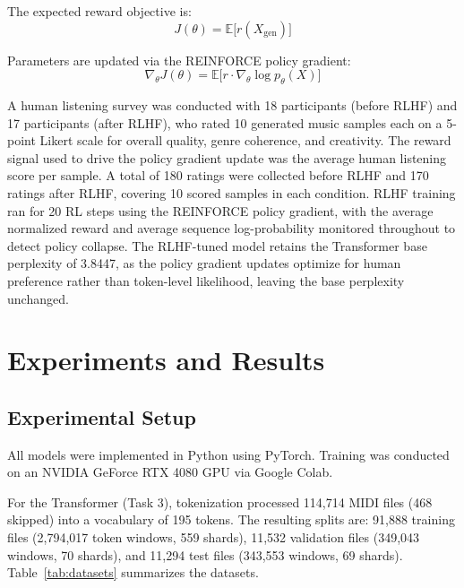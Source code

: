 \documentclass[conference]{IEEEtran}
\begin{document}
The expected reward objective is:
\begin{equation}
J(\theta) = \mathbb{E}\bigl[r(X_{\text{gen}})\bigr]
\end{equation}

Parameters are updated via the REINFORCE policy gradient:
\begin{equation}
\nabla_\theta J(\theta) = \mathbb{E}\bigl[r \cdot \nabla_\theta \log p_\theta(X)\bigr]
\end{equation}

A human listening survey was conducted with 18 participants (before RLHF) and
17 participants (after RLHF), who rated 10 generated music samples each on a
5-point Likert scale for overall quality, genre coherence, and creativity. The
reward signal used to drive the policy gradient update was the average human
listening score per sample. A total of 180 ratings were collected before RLHF
and 170 ratings after RLHF, covering 10 scored samples in each condition.
RLHF training ran for 20 RL steps using the REINFORCE policy gradient, with
the average normalized reward and average sequence log-probability monitored
throughout to detect policy collapse. The RLHF-tuned model retains the
Transformer base perplexity of 3.8447, as the policy gradient updates optimize
for human preference rather than token-level likelihood, leaving the base
perplexity unchanged.


\section{Experiments and Results}
\label{sec:experiments}

\subsection{Experimental Setup}

All models were implemented in Python using PyTorch. Training was conducted on
an NVIDIA GeForce RTX 4080 GPU via Google Colab.

For the Transformer (Task 3), tokenization processed 114,714 MIDI files
(468 skipped) into a vocabulary of 195 tokens. The resulting splits are:
91,888 training files (2,794,017 token windows, 559 shards), 11,532 validation
files (349,043 windows, 70 shards), and 11,294 test files (343,553 windows,
69 shards). Table~\ref{tab:datasets} summarizes the datasets.
\end{document}
